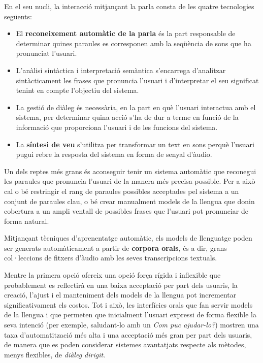 \begin{multicols}{2}
En el seu nucli, la interacció mitjançant la parla consta de les quatre tecnologies següents:
\begin{itemize}
\item El \textbf{reconeixement automàtic de la parla} és la part responsable de determinar quines paraules es corresponen amb la seqüència de sons que ha pronunciat l’usuari.
\item L’anàlisi sintàctica i interpretació semàntica s’encarrega d’analitzar sintàcticament les frases que pronuncia l’usuari i d’interpretar el seu significat tenint en compte l’objectiu del sistema.
\item La gestió de diàleg és necessària, en la part en què l’usuari interactua amb el sistema, per determinar quina acció s’ha de dur a terme en funció de la informació que proporciona l’usuari i de les funcions del sistema.
\item La \textbf{síntesi de veu} s’utilitza per transformar un text en sons perquè l’usuari pugui rebre la resposta del sistema en forma de senyal d’àudio. 
\end{itemize}

Un dels reptes més grans és aconseguir tenir un sistema automàtic que reconegui les paraules que pronuncia l’usuari de la manera més precisa possible. Per a això cal o bé restringir el rang de paraules possibles acceptades pel sistema a un conjunt de paraules clau, o bé crear manualment models de la llengua que donin cobertura a un ampli ventall de possibles frases que l’usuari pot pronunciar de forma natural. 

Mitjançant tècniques d'aprenentatge automàtic, els models de llenguatge poden ser generats automàticament a partir de \textbf{corpora orals}, és a dir, grans col·leccions de fitxers d'àudio amb les seves transcripcions textuals.

Mentre la primera opció ofereix una opció força rígida i inflexible que probablement es reflectirà en una baixa acceptació per part dels usuaris, la creació, l’ajust i el manteniment dels models de la llengua pot incrementar significativament els costos. Tot i això, les interfícies orals que fan servir models de la llengua i que permeten que inicialment l’usuari expressi de forma flexible la seva intenció (per exemple, saludant-lo amb un \textit{Com puc ajudar-lo?}) mostren una taxa d’automatització més alta i una acceptació més gran per part dels usuaris, de manera que es poden considerar sistemes avantatjats respecte als mètodes, menys flexibles, de \textit{diàleg dirigit}.


\end{multicols}
